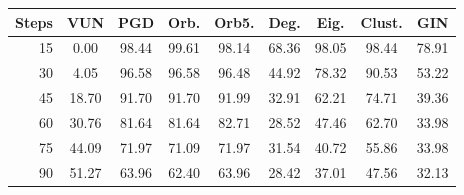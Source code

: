 \begin{tabular}{rcccccccc}
\toprule
\textbf{Steps} & \textbf{VUN} & \textbf{PGD} & \textbf{Orb.} & \textbf{Orb5.} & \textbf{Deg.} & \textbf{Eig.} & \textbf{Clust.} & \textbf{GIN} \\
\midrule
15 & 0.00 & 98.44 & 99.61 & 98.14 & 68.36 & 98.05 & 98.44 & 78.91 \\
30 & 4.05 & 96.58 & 96.58 & 96.48 & 44.92 & 78.32 & 90.53 & 53.22 \\
45 & 18.70 & 91.70 & 91.70 & 91.99 & 32.91 & 62.21 & 74.71 & 39.36 \\
60 & 30.76 & 81.64 & 81.64 & 82.71 & 28.52 & 47.46 & 62.70 & 33.98 \\
75 & 44.09 & 71.97 & 71.09 & 71.97 & 31.54 & 40.72 & 55.86 & 33.98 \\
90 & 51.27 & 63.96 & 62.40 & 63.96 & 28.42 & 37.01 & 47.56 & 32.13 \\
\bottomrule
\end{tabular}